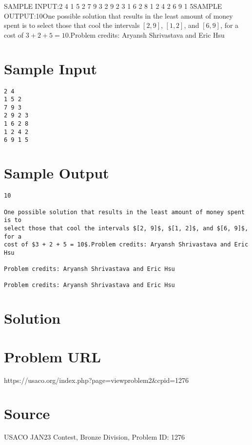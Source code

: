 \documentclass[12pt]{article}
\begin{document}
SAMPLE INPUT:2 4
1 5 2
7 9 3
2 9 2 3
1 6 2 8
1 2 4 2
6 9 1 5SAMPLE OUTPUT:10One possible solution that results in the least amount of money spent is to
select those that cool the intervals $[2, 9]$, $[1, 2]$, and $[6, 9]$, for a
cost of $3 + 2 + 5 = 10$.Problem credits: Aryansh Shrivastava and Eric Hsu

\section*{Sample Input}
\begin{verbatim}
2 4
1 5 2
7 9 3
2 9 2 3
1 6 2 8
1 2 4 2
6 9 1 5
\end{verbatim}

\section*{Sample Output}
\begin{verbatim}
10

One possible solution that results in the least amount of money spent is to
select those that cool the intervals $[2, 9]$, $[1, 2]$, and $[6, 9]$, for a
cost of $3 + 2 + 5 = 10$.Problem credits: Aryansh Shrivastava and Eric Hsu

Problem credits: Aryansh Shrivastava and Eric Hsu

Problem credits: Aryansh Shrivastava and Eric Hsu
\end{verbatim}

\section*{Solution}


\section*{Problem URL}
https://usaco.org/index.php?page=viewproblem2&cpid=1276

\section*{Source}
USACO JAN23 Contest, Bronze Division, Problem ID: 1276
\end{document}
